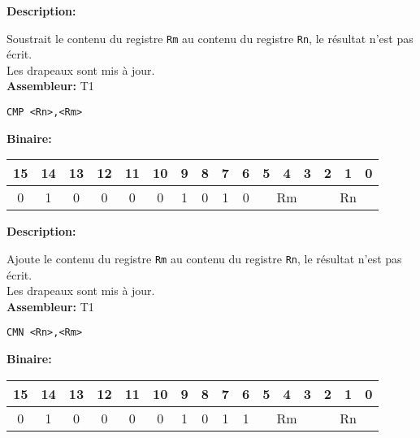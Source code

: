 
\textbf{Description: }

Soustrait le contenu du registre \texttt{Rm} au contenu du registre \texttt{Rn}, le résultat n'est pas écrit.\\
Les drapeaux sont mis à jour.\\

\textbf{Assembleur:} T1

\begin{lstlisting}
CMP <Rn>,<Rm>
\end{lstlisting}

\textbf{Binaire:}\\

\begin{tabular}{| c c c c c c c c c c c c c c c c |}
\hline
15 & 14 & 13 & 12 & 11 & 10 & \multicolumn{1}{|c}{9} & 8 & 7 & 6 & \multicolumn{1}{|c}{5} & 4 & 3 & \multicolumn{1}{|c}{2} & 1 & 0 \\
\hline
0 & 1 & 0 & 0 & 0 & 0 & \multicolumn{1}{|c}{1} & 0 & 1 & 0 & \multicolumn{3}{|c}{Rm} & \multicolumn{3}{|c|}{Rn} \\
\hline
\end{tabular}



\textbf{Description: }

Ajoute le contenu du registre \texttt{Rm} au contenu du registre \texttt{Rn}, le résultat n'est pas écrit.\\
Les drapeaux sont mis à jour.\\

\textbf{Assembleur:} T1

\begin{lstlisting}
CMN <Rn>,<Rm>
\end{lstlisting}

\textbf{Binaire:}\\

\begin{tabular}{| c c c c c c c c c c c c c c c c |}
\hline
15 & 14 & 13 & 12 & 11 & 10 & \multicolumn{1}{|c}{9} & 8 & 7 & 6 & \multicolumn{1}{|c}{5} & 4 & 3 & \multicolumn{1}{|c}{2} & 1 & 0 \\
\hline
0 & 1 & 0 & 0 & 0 & 0 & \multicolumn{1}{|c}{1} & 0 & 1 & 1 & \multicolumn{3}{|c}{Rm} & \multicolumn{3}{|c|}{Rn} \\
\hline
\end{tabular}


